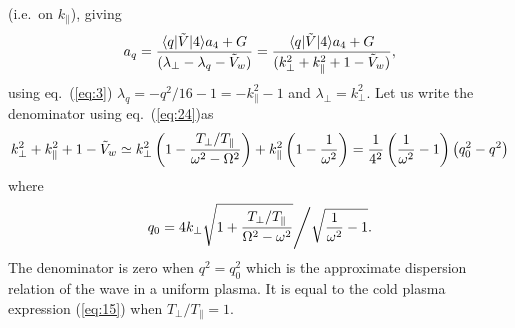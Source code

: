 \documentclass[12pt]{article}
\def\ket#1{|#1\rangle}
\def\bra#1{\langle#1}
\begin{document}
(i.e.\ on $k_\parallel$),
giving
\begin{equation}
  \label{eq:resonance}
  a_q = {\bra{q}|\tilde{V}\ket{4}a_4+G\over (\lambda_\perp-\lambda_q-\tilde{V}_{w})}
  ={\bra{q}|\tilde{V}\ket{4}a_4+G\over
    (k_\perp^2+k_\parallel^2+1-\tilde V_w) },
\end{equation}
using eq.\ (\ref{eq:3}) $\lambda_q=-q^2/16-1=-k_\parallel^2-1$ and
$\lambda_\perp=k_\perp^2$.
Let us write the denominator using eq.\ (\ref{eq:24})as
\begin{equation}
  \label{eq:25}
  k_\perp^2+k_\parallel^2+1-\tilde
  V_w\simeq k_\perp^2\left(1-{T_\perp/T_\parallel\over\omega^2-\Omega^2}\right)
  +k_\parallel^2\left(1-{1\over\omega^2}\right)
= {1\over4^2}\left({1\over\omega^2}-1\right)\left(q_0^2-q^2\right)
\end{equation}
where
\begin{equation}
  \label{eq:26}
  q_0=4k_\perp\sqrt{1+{T_\perp/T_\parallel\over\Omega^2-\omega^2}}
  \Bigg/\sqrt{{1\over\omega^2}-1}.
\end{equation}
The denominator is zero when $q^2=q_0^2$ which is the approximate
dispersion relation of the wave in a uniform plasma. It is equal to the cold
plasma expression (\ref{eq:15}) when $T_\perp/T_\parallel=1$.
\end{document}

